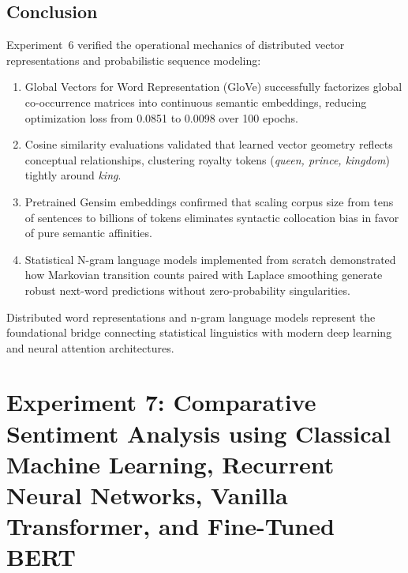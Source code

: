 \documentclass[12pt,a4paper]{report}
\begin{document}
\section{Conclusion}
Experiment~6 verified the operational mechanics of distributed vector representations and probabilistic sequence modeling:
\begin{enumerate}
    \item Global Vectors for Word Representation (GloVe) successfully factorizes global co-occurrence matrices into continuous semantic embeddings, reducing optimization loss from 0.0851 to 0.0098 over 100 epochs.
    \item Cosine similarity evaluations validated that learned vector geometry reflects conceptual relationships, clustering royalty tokens (\textit{queen, prince, kingdom}) tightly around \textit{king}.
    \item Pretrained Gensim embeddings confirmed that scaling corpus size from tens of sentences to billions of tokens eliminates syntactic collocation bias in favor of pure semantic affinities.
    \item Statistical N-gram language models implemented from scratch demonstrated how Markovian transition counts paired with Laplace smoothing generate robust next-word predictions without zero-probability singularities.
\end{enumerate}
Distributed word representations and n-gram language models represent the foundational bridge connecting statistical linguistics with modern deep learning and neural attention architectures.









\chapter{Experiment 7: Comparative Sentiment Analysis using Classical Machine Learning, Recurrent Neural Networks, Vanilla Transformer, and Fine-Tuned BERT}
\label{chap:exp7}
\end{document}
